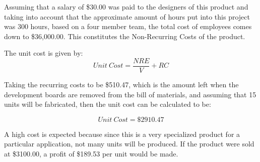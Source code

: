 \begin{landscape}
{\begin{center}
\begin{longtable}{|p{1.5in}|c|c|c|c|c|c|}
    
\end{longtable}%
\end{center}
}
 \end{landscape}
 \newpage
 
Assuming that a salary of \$30.00 was paid to the designers of this product and taking into account that the approximate amount of hours put into this project was 300 hours, based on a four member team, the total cost of employees comes down to \$36,000.00.  This constitutes the Non-Recurring Costs of the product.

The unit cost is given by:
\[Unit~Cost = \frac{NRE}{V} + RC\]

Taking the recurring costs to be \$510.47, which is the amount left when the development boards are removed from the bill of materials, and assuming that 15 units will be fabricated, then the unit cost can be calculated to be:

\[\boxed{Unit~Cost = \$2910.47 }\]

A high cost is expected because since this is a very specialized product for a particular application, not many units will be produced. If the product were sold at \$3100.00, a profit of \$189.53 per unit would be made.
